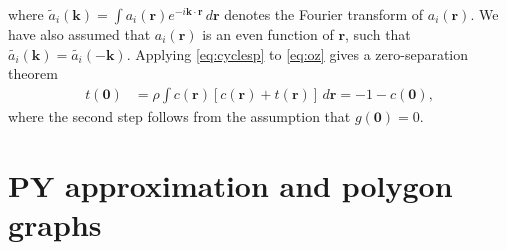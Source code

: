 \documentclass[notitlepage,preprint]{revtex4-1}
\newcommand{\vct}[1]{\mathbf{#1}}
\providecommand{\vr}{} %
\renewcommand{\vr}{\vct{r}}
\newcommand{\vk}{\vct{k}}
\begin{document}
%
where
  $\tilde{a}_i(\vk) = \int a_i(\vr) e^{-i \vk \cdot \vr} \, d\vr$
  denotes the Fourier transform of $a_i(\vr)$.
%
We have also assumed that
  $a_i(\vr)$ is an even function of $\vr$,
  such that
  $\tilde{a_i}(\vk) = \tilde{a_i}(-\vk)$.
%
Applying \eqref{eq:cyclesp} to \eqref{eq:oz} gives
  a zero-separation theorem\cite{rosenfeld1978}
%
\begin{align}
  t(\vct{0})
  &= \rho \int c(\vr) [c(\vr) + t(\vr)] \, d\vr
  = -1 - c(\vct{0}),
\label{eq:zerosep}
\end{align}
%
where the second step follows from the assumption that $g(\vct{0}) = 0$.





\section{\label{sec:py}PY approximation and polygon graphs}
\end{document}
